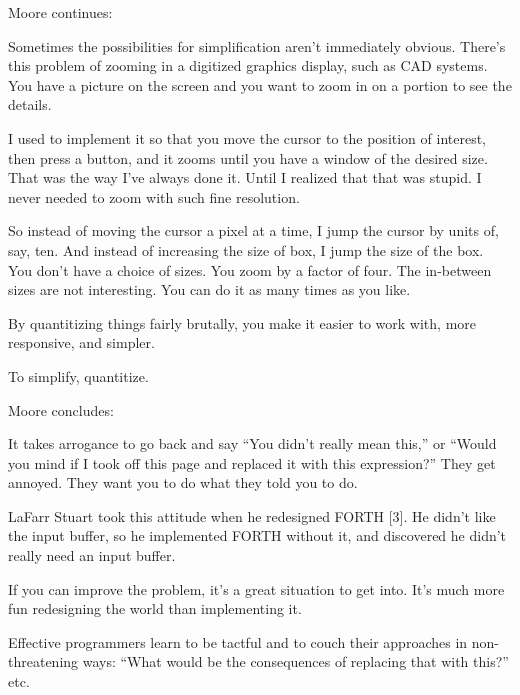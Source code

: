 


\bigskip\blackline{2ex}
\noindent Moore continues:

\begin{tfquot}
\noindent Sometimes the possibilities for simplification aren't immediately obvious.
There's this problem of zooming in a digitized graphics display, such as
CAD systems. You have a picture on the screen and you want to zoom in on
a portion to see the details.

I used to implement it so that you move the cursor to the position of
interest, then press a button, and it zooms until you have a window of the
desired size. That was the way I've always done it. Until I realized that that
was stupid. I never needed to zoom with such fine resolution.

So instead of moving the cursor a pixel at a time, I jump the cursor by units
of, say, ten. And instead of increasing the size of box, I jump the size of the
box. You don't have a choice of sizes. You zoom by a factor of four. The
in-between sizes are not interesting. You can do it as many times as you
like.

By quantitizing things fairly brutally, you make it easier to work with,
more responsive, and simpler.
\end{tfquot}
\blackline{1ex}

\begin{tip}
To simplify, quantitize.
\end{tip}

\bigskip\blackline{2ex}
\noindent Moore concludes:
\begin{tfquot}
\noindent It takes arrogance to go back and say ``You didn't really mean this,'' or
``Would you mind if I took off this page and replaced it with this
expression?'' They get annoyed. They want you to do what they told you to do.

LaFarr Stuart took this attitude when he redesigned FORTH {[}3{]}. He didn't
like the input buffer, so he implemented FORTH without it, and discovered
he didn't really need an input buffer.

If you can improve the problem, it's a great situation to get into. It's much
more fun redesigning the world than implementing it.
\end{tfquot}
\blackline{1ex}

\noindent Effective programmers learn to be tactful and to couch their approaches
in non-threatening ways: ``What would be the consequences of replacing
that with this?'' etc.

